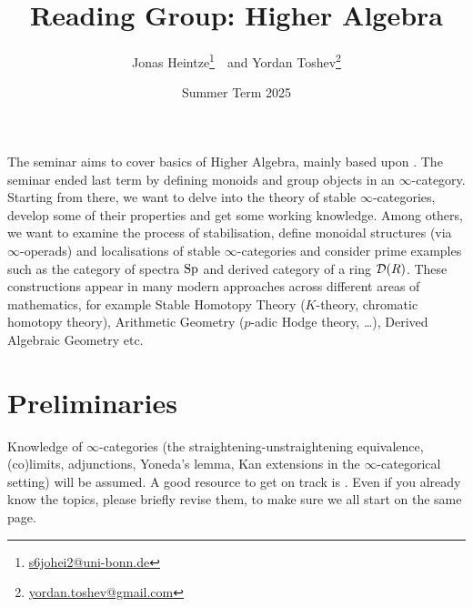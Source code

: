 \documentclass{article}
\title{\vspace{-60pt}Reading Group: Higher Algebra}
\author{Jonas Heintze\thanks{\href{mailto:s6johei2@uni-bonn.de}{
      \url{s6johei2@uni-bonn.de}}}~~and 
  Yordan Toshev\thanks{\href{mailto:yordan.toshev@uni-bonn.de}{
\url{yordan.toshev@gmail.com}}}}
\date{Summer Term 2025}
\begin{document}
\maketitle



\vspace{-5pt}
The seminar aims to cover basics of Higher Algebra, mainly based
upon \cite[Chapter II]{K-ThrNotes}.
The seminar ended last term by defining monoids and 
group objects in an $\infty$-category.
Starting from there, we want to delve into the
theory of stable $\infty$-categories, develop some
of their properties and get some working knowledge.
Among others, we want to examine the process of
stabilisation, define monoidal structures (via $\infty$-operads) 
and localisations 
of stable $\infty$-categories and consider prime examples such as
the category of spectra $\mathrm{Sp}$ and derived category of a 
ring $\mathcal{D}(R)$.
These constructions appear in many modern approaches across different areas of 
mathematics,
for example
Stable Homotopy Theory ($K$-theory, chromatic homotopy theory),
Arithmetic Geometry ($p$-adic Hodge theory, \dots),
Derived Algebraic Geometry etc.


\section*{Preliminaries}
Knowledge of $\infty$-categories
(the straightening-unstraightening equivalence, (co)limits,
adjunctions, Yoneda's lemma, Kan extensions in the $\infty$-categorical
setting) will be assumed.
A good resource to get on track is \cite[Chapters 1-6]{infty-CatNotes}.
Even if you already know the topics, please briefly revise them,
to make sure we all start on the same page.
\end{document}
